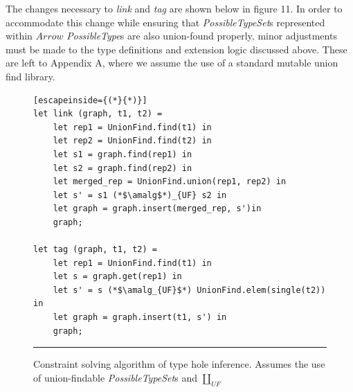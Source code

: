 The changes necessary to \textit{link} and \textit{tag} are shown below in figure 11. In order to accommodate this change while ensuring that \textit{PossibleTypeSet}s represented within $Arrow$ \textit{PossibleType}s are also union-found properly, minor adjustments must be made to the type definitions and extension logic discussed above. These are left to Appendix A, where we assume the use of a standard mutable union find library.


\begin{figure}[htbp]
\begin{lstlisting}[escapeinside={(*}{*)}]
let link (graph, t1, t2) =
    let rep1 = UnionFind.find(t1) in
    let rep2 = UnionFind.find(t2) in
    let s1 = graph.find(rep1) in
    let s2 = graph.find(rep2) in 
    let merged_rep = UnionFind.union(rep1, rep2) in
    let s' = s1 (*$\amalg$*)_{UF} s2 in
    let graph = graph.insert(merged_rep, s')in
    graph;

let tag (graph, t1, t2) =
    let rep1 = UnionFind.find(t1) in
    let s = graph.get(rep1) in
    let s' = s (*$\amalg_{UF}$*) UnionFind.elem(single(t2)) in
    let graph = graph.insert(t1, s') in 
    graph;
\end{lstlisting}
\vspace{-4px}
 \hrule
\caption{Constraint solving algorithm of type hole inference. Assumes the use of union-findable \textit{PossibleTypeSet}s and $\amalg_{UF}$}
\label{fig:algcode}
\end{figure}



